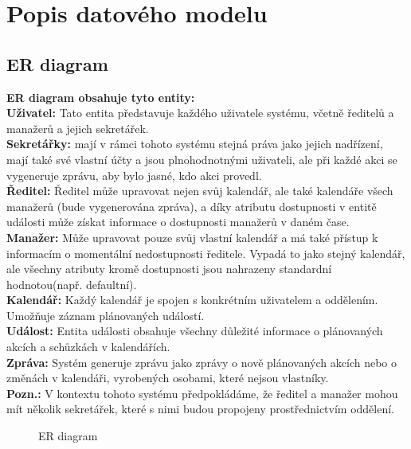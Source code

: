\documentclass[11pt,a4paper]{article}
\begin{document}
    \section{Popis datového modelu}
    \subsection{ER diagram}
    \textbf{ER diagram obsahuje tyto entity:}\\
    \textbf{Uživatel:} Tato entita představuje každého uživatele systému, včetně ředitelů a manažerů a jejich sekretářek.\\
    \textbf{Sekretářky:} mají v rámci tohoto systému stejná práva jako jejich nadřízení, mají také své vlastní účty a jsou plnohodnotnými uživateli, ale při každé akci se vygeneruje zprávu, aby bylo jasné, kdo akci provedl.\\
    \textbf{Ředitel:} Ředitel může upravovat nejen svůj kalendář, ale také kalendáře všech manažerů (bude vygenerována zpráva), a díky atributu dostupnosti v entitě události může získat informace o dostupnosti manažerů v daném čase.\\
    \textbf{Manažer:} Může upravovat pouze svůj vlastní kalendář a má také přístup k informacím o momentální nedostupnosti ředitele. Vypadá to jako stejný kalendář, ale všechny atributy kromě dostupnosti jsou nahrazeny standardní hodnotou(např. defaultní).\\
    \textbf{Kalendář:} Každý kalendář je spojen s konkrétním uživatelem a oddělením. Umožňuje záznam plánovaných událostí.\\
    \textbf{Událost:} Entita události obsahuje všechny důležité informace o plánovaných akcích a schůzkách v kalendářích.\\
    \textbf{Zpráva:} Systém generuje zprávu jako zprávy o nově plánovaných akcích nebo o změnách v kalendáři, vyrobených osobami, které nejsou vlastníky.\\
    \textbf{Pozn.:} V kontextu tohoto systému předpokládáme, že ředitel a manažer mohou mít několik sekretářek, které s nimi budou propojeny prostřednictvím oddělení.

    \begin{figure}[h]
    \centering
    
    \caption{ER diagram}
    \end{figure}
    \newpage
\end{document}
